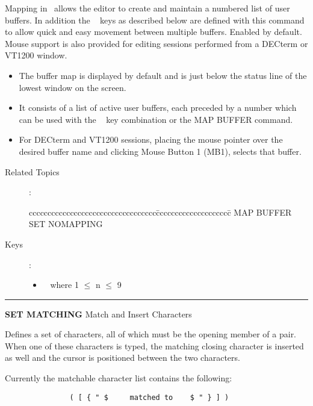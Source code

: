 \medskip
  Mapping in \STEve\ allows the editor to create and maintain a numbered
  list of user buffers. In addition the \gold\  keys as 
  described below are
  defined with this command to allow quick and easy movement between
  multiple buffers. Enabled by default. Mouse support is also provided for
  editing sessions performed from a DECterm or VT1200 window.
  \begin{itemize}
  \item  The buffer map is displayed by default and is just below the status
         line of the lowest window on the screen.
  \item  It consists of a list of active user buffers, each preceded
         by a number which can be used with the \gold\  key
         combination or the MAP BUFFER command.
  \item  For DECterm and VT1200 sessions, placing the mouse pointer over
         the desired buffer name and clicking Mouse Button 1 (MB1), selects
         that buffer.
  \end{itemize}

\begin{description}
\item[Related Topics]:
\begin{tabbing}
cccccccccccccccccccccccccccccccccc\=cccccccccccccccccccc\=\kill
MAP BUFFER  \> SET NOMAPPING  \\
\end{tabbing}

\item[Keys]:
          \begin{itemize}
          \item \gold\  where 1 $\leq$ n $\leq$ 9
          \end{itemize}

\end{description}

\goodbreak

\rule{\textwidth}{0.3mm}

{\Large {\bf SET MATCHING} \hfill Match and Insert Characters}

\medskip
  Defines a set of characters, all of which must be the opening member
  of a pair. When one of these characters is typed, the matching closing
  character is inserted as well and the cursor is positioned between the
  two characters.

  Currently the matchable character list contains the following:
\begin{verbatim}
               ( [ { " $     matched to    $ " } ] )
\end{verbatim}

